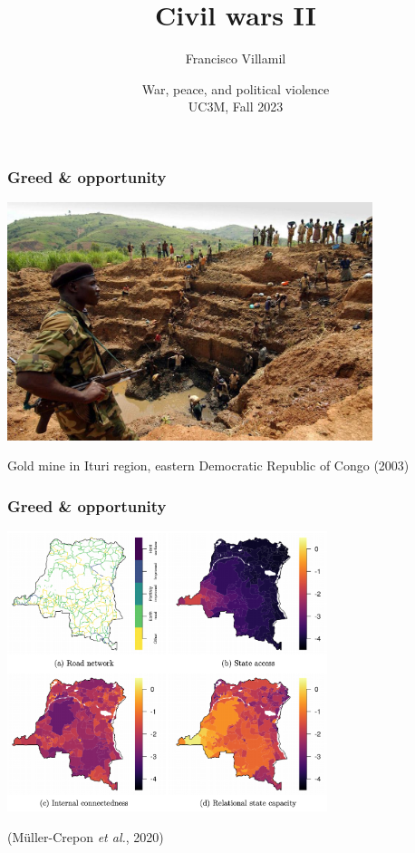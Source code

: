 \documentclass[aspectratio=43]{beamer}
\title{\huge Civil wars II}
\author{Francisco Villamil}
\date{War, peace, and political violence\\UC3M, Fall 2023}
\begin{document}
\begin{frame}
  \titlepage
\end{frame}

\begin{frame}
\frametitle{Greed \& opportunity}
\centering

\includegraphics[width = 0.8\textwidth]{img/conflict_diamonds}

\vspace{10pt}
{\small Gold mine in Ituri region, eastern Democratic Republic of Congo (2003)}

\end{frame}

\begin{frame}
\frametitle{Greed \& opportunity}
\centering

\includegraphics[width = 0.7\textwidth]{img/muller-crepon}

{\small (Müller-Crepon \textit{et al.}, 2020)}

\end{frame}
\end{document}
